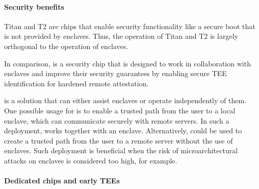 \paragraph{Security benefits}
Titan and T2 are chips that enable security functionality like a secure boot that is not provided by enclaves. Thus, the operation of Titan and T2 is largely orthogonal to the operation of enclaves. 

In comparison, \proximitee is a security chip that is designed to work in collaboration with enclaves and improve their security guarantees by enabling secure TEE identification for hardened remote attestation. 

\protection is a solution that can either assist enclaves or operate independently of them. One possible usage for \protection is to enable a trusted path from the user to a local enclave, which can communicate securely with remote servers. In such a deployment, \protection works together with an enclave. 
%
Alternatively, \protection could be used to create a trusted path from the user to a remote server without the use of enclaves. Such deployment is beneficial when the risk of microarchitectural attacks on enclaves is considered too high, for example.


\paragraph{Dedicated chips and early TEEs}



